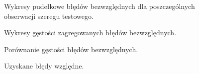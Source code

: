 \documentclass[11pt]{report}
\begin{document}
\begin{figure}[H]
    \centering
    \begin{subfigure}[b]{0.3\textwidth}
        \centering
        \def\svgwidth{\columnwidth}
        
    \end{subfigure}
    \begin{subfigure}[b]{0.3\textwidth}
        \centering
        \def\svgwidth{\columnwidth}
        
    \end{subfigure}
    \begin{subfigure}[b]{0.3\textwidth}
        \centering
        \def\svgwidth{\columnwidth}
        
    \end{subfigure}
     \caption{Wykresy pudełkowe błędów bezwzględnych dla poszczególnych obserwacji szeregu testowego.}
\end{figure}

\begin{figure}[H]
    \centering
    \begin{subfigure}[b]{0.3\textwidth}
        \centering
        \def\svgwidth{\columnwidth}
        
    \end{subfigure}
    \begin{subfigure}[b]{0.3\textwidth}
        \centering
        \def\svgwidth{\columnwidth}
        
    \end{subfigure}
    \begin{subfigure}[b]{0.3\textwidth}
        \centering
        \def\svgwidth{\columnwidth}
        
    \end{subfigure}
     \caption{Wykresy gęstości zagregowanych błędów bezwzględnych.}
\end{figure}

\begin{figure}[H]
    \centering
    \centering
    \def\svgwidth{10cm}
    
    \caption{Porównanie gęstości błędów bezwzględnych.}
\end{figure}


\begin{figure}[H]
    \centering
    \begin{subfigure}[b]{0.3\textwidth}
        \centering
        \def\svgwidth{\columnwidth}
        
    \end{subfigure}
    \begin{subfigure}[b]{0.3\textwidth}
        \centering
        \def\svgwidth{\columnwidth}
        
    \end{subfigure}
    \begin{subfigure}[b]{0.3\textwidth}
        \centering
        \def\svgwidth{\columnwidth}
        
    \end{subfigure}
     \caption{Uzyskane błędy względne.}
\end{figure}
\end{document}
